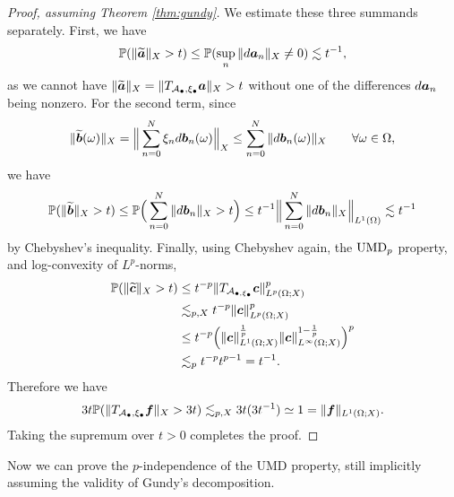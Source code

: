 \begin{proof}[Proof, assuming Theorem \ref{thm:gundy}]
  We estimate these three summands separately.
  First, we have
  \begin{equation*}
    \begin{aligned}
      \mathbb{P}(\|\widetilde{ \bm{a} }\|_{X} > t)
      \leq \mathbb{P}(\sup_{n} \|d \bm{a}_{n}\|_{X} \neq 0) \lesssim t^{-1},
    \end{aligned}
  \end{equation*}
  as we cannot have $\| \widetilde{ \bm{a} }  \|_{X} = \|T_{ \mathcal{A}_{\bullet}, \xi_{\bullet} } \bm{a}\|_{X}> t$ without one of the differences $d\bm{a}_{n}$ being nonzero.
  For the second term, since
  \begin{equation*}
    \|\widetilde{\bm{b}}(\omega)\|_{X} = \Big\| \sum_{n=0}^{N} \xi_{n} d\bm{b}_{n}(\omega) \Big\|_{X} \leq \sum_{n = 0}^{N} \|d\bm{b}_{n}(\omega)\|_{X} \qquad \forall \omega \in \Omega,
  \end{equation*}
  we have
  \begin{equation*}
    \mathbb{P}(\|\widetilde{\bm{b}}\|_{X} > t) \leq \mathbb{P}\Big( \sum_{n = 0}^{N} \|d\bm{b}_{n}\|_{X} > t \Big)
    \leq t^{-1} \Big\|  \sum_{n = 0}^{N} \|d\bm{b}_{n}\|_{X} \Big\|_{L^1(\Omega)} \lesssim t^{-1}
  \end{equation*}
  by Chebyshev's inequality.
  Finally, using Chebyshev again, the $\mathrm{UMD}_{p}$ property, and log-convexity of $L^p$-norms,
  \begin{equation*}
    \begin{aligned}
      \mathbb{P}(\|\widetilde{\bm{c}}\|_{X} > t)
      &\leq t^{-p}\|T_{\mathcal{A}_{\bullet, \xi_{\bullet}}} \bm{c} \|_{L^p(\Omega;X)}^{p} \\
      &\lesssim_{p,X} t^{-p} \|\bm{c} \|_{L^p(\Omega;X)}^{p} \\
      &\leq t^{-p}  \Big( \|\bm{c} \|_{L^1(\Omega;X)}^{\frac{1}{p}} \|\bm{c}\|_{L^\infty(\Omega;X)}^{1-\frac{1}{p}} \Big)^{p} \\
      &\lesssim_{p} t^{-p}  t^{p-1} = t^{-1} .
    \end{aligned}
  \end{equation*}
  Therefore we have
  \begin{equation*}
    3t\mathbb{P}(\|T_{\mathcal{A}_{\bullet}, \xi_{\bullet}} \bm{f}\|_{X} > 3t)
    \lesssim_{p,X} 3t(3t^{-1}) \simeq 1 = \|\bm{f}\|_{L^{1}(\Omega;X)}.
  \end{equation*}
  Taking the supremum over $t > 0$ completes the proof.
\end{proof}

Now we can prove the $p$-independence of the UMD property, still implicitly assuming the validity of Gundy's decomposition.

